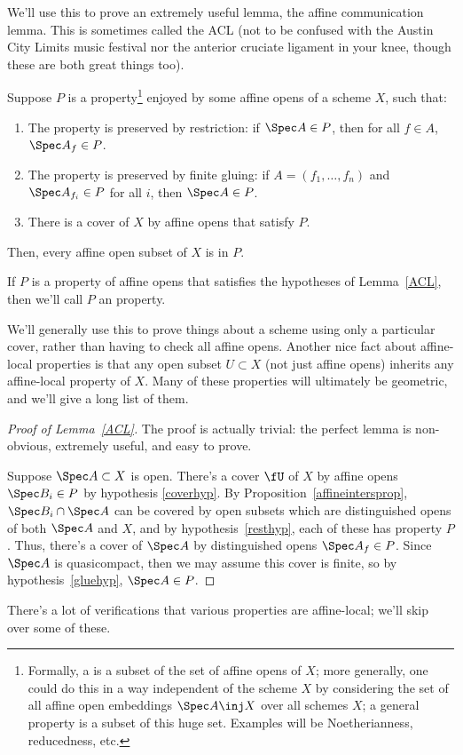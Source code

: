 We'll use this to prove an extremely useful lemma, the affine communication lemma. This is sometimes called the ACL
(not to be confused with the Austin City Limits music festival nor the anterior cruciate ligament in your knee,
though these are both great things too).
\begin{lem}
\label{ACL}
Suppose \(P\) is a property\footnote{Formally, a  is a subset of the set of affine opens of \(X\);
more generally, one could do this in a way independent of the scheme \(X\) by considering the set of all affine
open embeddings \(\Spec A\inj X\) over all schemes \(X\); a general property is a subset of this huge set. Examples
will be Noetherianness, reducedness, etc.}
enjoyed by some affine opens of a scheme \(X\), such that:
\begin{enumerate}
	\item\label{resthyp} The property is preserved by restriction: if \(\Spec A\in P\), then for all \(f\in A\),
	\(\Spec A_f\in P\).
	\item\label{gluehyp} The property is preserved by finite gluing: if \(A = (f_1,\dotsc,f_n)\) and \(\Spec
	A_{f_i}\in P\) for all \(i\), then \(\Spec A\in P\).
	\item\label{coverhyp} There is a cover of \(X\) by affine opens that satisfy \(P\).
\end{enumerate}
Then, every affine open subset of \(X\) is in \(P\).
\end{lem}
\begin{defn}
If \(P\) is a property of affine opens that satisfies the hypotheses of Lemma~\ref{ACL}, then we'll call \(P\) an
 property.
\end{defn}
We'll generally use this to prove things about a scheme using only a particular cover, rather than having to check
all affine opens. Another nice fact about affine-local properties is that any open subset \(U\subset X\) (not just
affine opens) inherits any affine-local property of \(X\). Many of these properties will ultimately be geometric,
and we'll give a long list of them.
\begin{proof}[Proof of Lemma~\ref{ACL}]
The proof is actually trivial: the perfect lemma is non-obvious, extremely useful, and easy to prove.

Suppose \(\Spec A\subset X\) is open. There's a cover \(\fU\) of \(X\) by affine opens \(\Spec B_i\in P\) by
hypothesis \eqref{coverhyp}. By Proposition~\ref{affineintersprop}, \(\Spec B_i\cap\Spec A\) can be covered by open
subsets which are distinguished opens of both \(\Spec A\) and \(X\), and by hypothesis~\eqref{resthyp}, each of
these has property \(P\). Thus, there's a cover of \(\Spec A\) by distinguished opens \(\Spec A_f\in P\).
Since \(\Spec A\) is quasicompact, then we may assume this cover is finite, so by hypothesis~\eqref{gluehyp},
\(\Spec A\in P\).
\end{proof}
There's a lot of verifications that various properties are affine-local; we'll skip over some of these.

